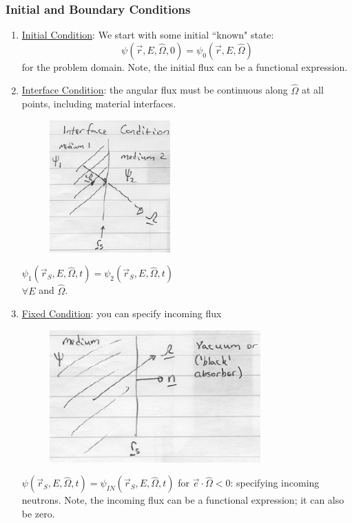 \documentclass[12pt]{article}
\newcommand{\vOmega}{\ensuremath{\hat{\Omega}}}
\begin{document}
\subsubsection{Initial and Boundary Conditions}
\begin{enumerate}
\item \underline{Initial Condition}: We start with some initial ``known" state:
\[\psi(\vec{r}, E, \vOmega, 0) = \psi_0(\vec{r}, E, \vOmega)\]
for the problem domain. Note, the initial flux can be a functional expression.

\item \underline{Interface Condition}: the angular flux must be continuous along $\vOmega$ at all points, including material interfaces.

\begin{minipage}{0.5\textwidth}
\begin{figure}[H]
\includegraphics[height=2in]{InterfaceCondition}
\end{figure}
\end{minipage} \hfill
\begin{minipage}{0.45\textwidth}
$\psi_1(\vec{r}_S, E, \vOmega, t) = \psi_2(\vec{r}_S, E, \vOmega, t)$\\ $\forall E$ and $\vOmega$.
\end{minipage}

\clearpage
\item \underline{Fixed Condition}: you can specify incoming flux

\begin{minipage}{0.5\textwidth}
\begin{figure}[H]
\includegraphics[height=2in]{FreeSurfaceCondition}
\end{figure}
\end{minipage} \hfill
\begin{minipage}{0.45\textwidth}
$\psi(\vec{r}_S, E, \vOmega, t) = \psi_{IN}(\vec{r}_S, E, \vOmega, t)$ for $\vec{e} \cdot \vOmega < 0$: specifying incoming neutrons. Note, the incoming flux can be a functional expression; it can also be zero.


\end{minipage}
\end{enumerate}
\end{document}
